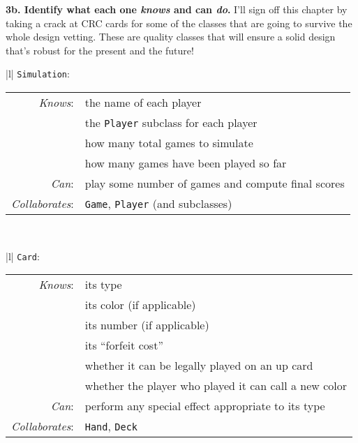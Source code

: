 \vspace{.1in}
\textbf{3b. Identify what each one \textit{knows} and can \textit{do}.}
I'll sign off this chapter by taking a crack at CRC cards for some of the
classes that are going to survive the whole design vetting. These are quality
classes that will ensure a solid design that's robust for the present and the
future!

\label{unoCRC1}
\small
\begin{center}
\begin{tabular}{|l|}
\hline
\texttt{Simulation}:\\
\hline
\begin{tabular}{rl}
\textit{Knows}: & the name of each player \\
& the \texttt{Player} subclass for each player \\
& how many total games to simulate \\
& how many games have been played so far \\
\textit{Can}: & play some number of games and compute final scores \\
\hline
\textit{Collaborates}: & \texttt{Game}, \texttt{Player} (and subclasses)\\
\end{tabular}\\
\hline
\end{tabular}
\end{center}

\begin{center}
\begin{tabular}{|l|}
\hline
\texttt{Card}:\\
\hline
\begin{tabular}{rl}
\textit{Knows}: & its type \\
& its color (if applicable) \\
& its number (if applicable) \\
& its ``forfeit cost'' \\
& whether it can be legally played on an up card \\
& whether the player who played it can call a new color \\
\textit{Can}: & perform any special effect appropriate to its type \\
\hline
\textit{Collaborates}: & \texttt{Hand}, \texttt{Deck} \\
\end{tabular}\\
\hline
\end{tabular}
\end{center}

